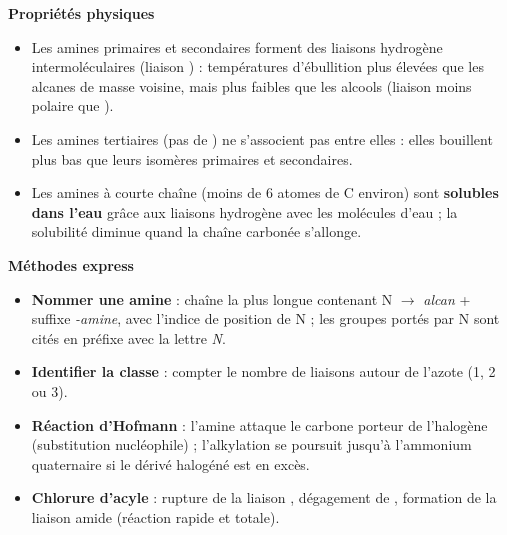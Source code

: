 \documentclass[11pt]{article}
\newcommand{\cle}[1]{{\popxbold\color{popdark}#1}}
\begin{document}
\begin{bilan}
\textbf{Propri\'et\'es physiques}
\begin{itemize}
  \item Les amines primaires et secondaires forment des \cle{liaisons hydrog\`ene} intermol\'eculaires (liaison ) : temp\'eratures d'\'ebullition plus \'elev\'ees que les alcanes de masse voisine, mais plus faibles que les alcools (liaison  moins polaire que ).
  \item Les amines tertiaires (pas de ) ne s'associent pas entre elles : elles bouillent plus bas que leurs isom\`eres primaires et secondaires.
  \item Les amines \`a courte cha\^ine (moins de 6 atomes de C environ) sont \textbf{solubles dans l'eau} gr\^ace aux liaisons hydrog\`ene avec les mol\'ecules d'eau ; la solubilit\'e diminue quand la cha\^ine carbon\'ee s'allonge.
\end{itemize}

\textbf{M\'ethodes express}
\begin{itemize}
  \item \textbf{Nommer une amine} : cha\^ine la plus longue contenant N $\to$ \emph{alcan} + suffixe \emph{-amine}, avec l'indice de position de N ; les groupes port\'es par N sont cit\'es en pr\'efixe avec la lettre \emph{N}.
  \item \textbf{Identifier la classe} : compter le nombre de liaisons  autour de l'azote (1, 2 ou 3).
  \item \textbf{R\'eaction d'Hofmann} : l'amine attaque le carbone porteur de l'halog\`ene (substitution nucl\'eophile) ; l'alkylation se poursuit jusqu'\`a l'ammonium quaternaire si le d\'eriv\'e halog\'en\'e est en exc\`es.
  \item \textbf{Chlorure d'acyle} : rupture de la liaison , d\'egagement de , formation de la liaison amide  (r\'eaction rapide et totale).
\end{itemize}
\end{bilan}
\end{document}
